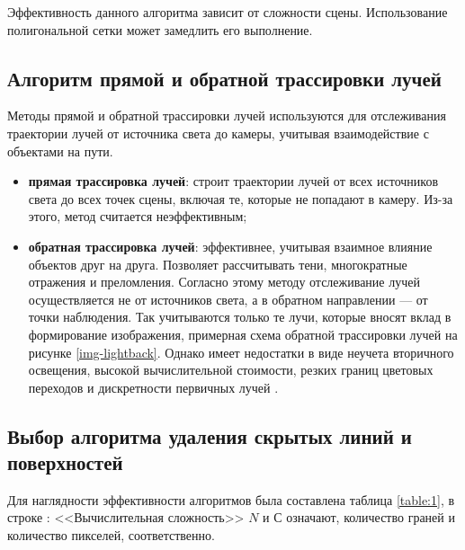 Эффективность данного алгоритма зависит от сложности сцены. Использование полигональной сетки может замедлить его выполнение.


\subsection{Алгоритм прямой и обратной трассировки лучей}

Методы прямой и обратной трассировки лучей используются для отслеживания траектории лучей от источника света до камеры, учитывая взаимодействие с объектами на пути. 

\begin{itemize}
	\item \textbf{прямая трассировка лучей}: строит траектории лучей от всех источников света до всех точек сцены, включая те, которые не попадают в камеру. Из-за этого, метод считается неэффективным;
	
	\item \textbf{обратная трассировка лучей}: эффективнее, учитывая взаимное влияние объектов друг на друга. Позволяет рассчитывать тени, многократные отражения и преломления. Согласно этому методу отслеживание лучей осуществляется не от источников света, а в обратном направлении --- от точки наблюдения. Так учитываются только те лучи, которые вносят вклад в формирование изображения, примерная схема обратной трассировки лучей на рисунке \ref{img-lightback}. Однако имеет недостатки в виде неучета вторичного освещения, высокой вычислительной стоимости, резких границ цветовых переходов и дискретности первичных лучей \cite{ray_tracing}.
	
\end{itemize}
 
 
\subsection{Выбор алгоритма удаления скрытых линий и поверхностей}


Для наглядности эффективности алгоритмов была составлена таблица \ref{table:1}, в строке : <<Вычислительная сложность>> $N$ и $С$ означают, количество граней и количество пикселей, соответственно.


